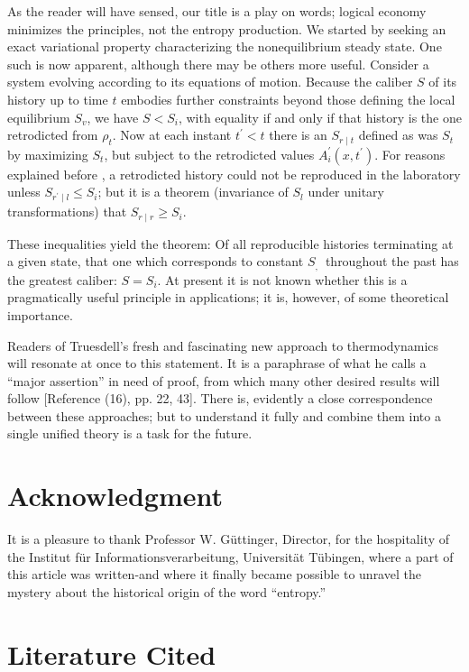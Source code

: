 \documentclass{article}
\begin{document}
As the reader will have sensed, our title is a play on words; logical economy minimizes the principles, not the entropy production. We started by seeking an exact variational property characterizing the nonequilibrium steady state. One such is now apparent, although there may be others more useful. Consider a system evolving according to its equations of motion. Because the caliber $S$ of its history up to time $t$ embodies further constraints beyond those defining the local equilibrium $S_v$, we have $S<S_i$, with equality if and only if that history is the one retrodicted from $\rho_t$. Now at each instant $t^{\prime}<t$ there is an $S_{r \mid t}$ defined as was $S_t$ by maximizing $S_t$, but subject to the retrodicted values $A_i^{\prime}\left(x, t^{\prime}\right)$. For reasons explained before \cite{jaynes1963}, a retrodicted history could not be reproduced in the laboratory unless $S_{r^{\prime} \mid l} \leqslant S_i$; but it is a theorem (invariance of $S_l$ under unitary transformations) that $S_{r \mid r} \geqslant S_i$.

These inequalities yield the theorem: Of all reproducible histories terminating at a given state, that one which corresponds to constant $S_{\text {, }}$ throughout the past has the greatest caliber: $S=S_i$. At present it is not known whether this is a pragmatically useful principle in applications; it is, however, of some theoretical importance.

Readers of Truesdell's fresh and fascinating new approach to thermodynamics \cite{truesdell1969} will resonate at once to this statement. It is a paraphrase of what he calls a ``major assertion'' in need of proof, from which many other desired results will follow [Reference (16), pp. 22, 43]. There is, evidently a close correspondence between these approaches; but to understand it fully and combine them into a single unified theory is a task for the future.

\section*{Acknowledgment}

It is a pleasure to thank Professor W. Güttinger, Director, for the hospitality of the Institut für Informationsverarbeitung, Universität Tübingen, where a part of this article was written-and where it finally became possible to unravel the mystery about the historical origin of the word ``entropy.''

\section*{Literature Cited}
\end{document}
